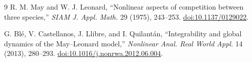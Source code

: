 \documentclass[10pt]{article}
\theoremstyle{remark}
\begin{document}
\begin{thebibliography}{9}
R. M. May and W. J. Leonard,
``Nonlinear aspects of competition between three species,''
\emph{SIAM J. Appl. Math.} 29 (1975), 243--253.
\href{https://doi.org/10.1137/0129022}{doi:10.1137/0129022}.

G. Bl\'e, V. Castellanos, J. Llibre, and I. Quilant\'an,
``Integrability and global dynamics of the May--Leonard model,''
\emph{Nonlinear Anal. Real World Appl.} 14 (2013), 280--293.
\href{https://doi.org/10.1016/j.nonrwa.2012.06.004}{doi:10.1016/j.nonrwa.2012.06.004}.
\end{thebibliography}
\fi
\end{document}
